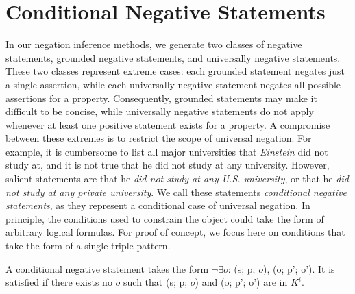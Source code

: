 \section{Conditional Negative Statements}
\label{sec:restricted}

In our negation inference methods, we generate two classes of negative statements, grounded negative statements, and universally negative statements. These two classes represent extreme cases: each grounded statement negates just a single assertion, while each universally negative statement negates all possible assertions for a property. Consequently, grounded statements may make it difficult to be concise, while universally negative statements do not apply whenever at least one positive statement exists for a property.
A compromise between these extremes is to restrict the scope of universal negation. For example, it is cumbersome to list all major universities that \textit{Einstein} did not study at, and it is not true that he did not study at any university. However, salient statements are that he \textit{did not study at any U.S. university}, or that he \textit{did not study at any private university}.
We call these statements \emph{conditional negative statements}, as they represent a conditional case of universal negation. In principle, the conditions used to constrain the object could take the form of arbitrary logical formulas. For proof of concept, we focus here on conditions that take the form of a single triple pattern.

\begin{defn}
A conditional negative statement takes the form $\neg \exists o$: (s; p; $o$), (o; p'; o'). It is satisfied if there exists no $o$ such that (s; p; $o$) and  (o; p'; o') are in $K^i$.%
\end{defn}


